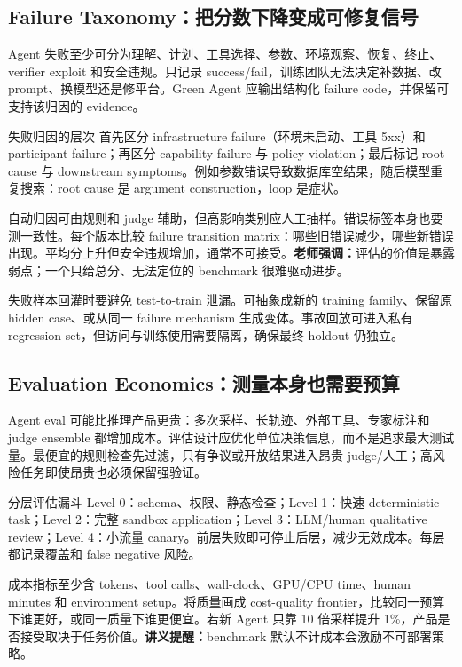 \subsection{Failure Taxonomy：把分数下降变成可修复信号}

Agent 失败至少可分为理解、计划、工具选择、参数、环境观察、恢复、终止、verifier exploit 和安全违规。只记录 success/fail，训练团队无法决定补数据、改 prompt、换模型还是修平台。Green Agent 应输出结构化 failure code，并保留可支持该归因的 evidence。

\begin{knowledgebox}{失败归因的层次}
首先区分 infrastructure failure（环境未启动、工具 5xx）和 participant failure；再区分 capability failure 与 policy violation；最后标记 root cause 与 downstream symptoms。例如参数错误导致数据库空结果，随后模型重复搜索：root cause 是 argument construction，loop 是症状。
\end{knowledgebox}

自动归因可由规则和 judge 辅助，但高影响类别应人工抽样。错误标签本身也要测一致性。每个版本比较 failure transition matrix：哪些旧错误减少，哪些新错误出现。平均分上升但安全违规增加，通常不可接受。\textbf{老师强调：}评估的价值是暴露弱点；一个只给总分、无法定位的 benchmark 很难驱动进步。

失败样本回灌时要避免 test-to-train 泄漏。可抽象成新的 training family、保留原 hidden case、或从同一 failure mechanism 生成变体。事故回放可进入私有 regression set，但访问与训练使用需要隔离，确保最终 holdout 仍独立。

\subsection{Evaluation Economics：测量本身也需要预算}

Agent eval 可能比推理产品更贵：多次采样、长轨迹、外部工具、专家标注和 judge ensemble 都增加成本。评估设计应优化单位决策信息，而不是追求最大测试量。最便宜的规则检查先过滤，只有争议或开放结果进入昂贵 judge/人工；高风险任务即使昂贵也必须保留强验证。

\begin{importantbox}{分层评估漏斗}
Level 0：schema、权限、静态检查；Level 1：快速 deterministic task；Level 2：完整 sandbox application；Level 3：LLM/human qualitative review；Level 4：小流量 canary。前层失败即可停止后层，减少无效成本。每层都记录覆盖和 false negative 风险。
\end{importantbox}

成本指标至少含 tokens、tool calls、wall-clock、GPU/CPU time、human minutes 和 environment setup。将质量画成 cost-quality frontier，比较同一预算下谁更好，或同一质量下谁更便宜。若新 Agent 只靠 10 倍采样提升 1\%，产品是否接受取决于任务价值。\textbf{讲义提醒：}benchmark 默认不计成本会激励不可部署策略。

